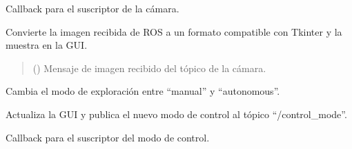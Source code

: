 \documentclass[a4paper,10pt,spanish]{sphinxmanual}
\begin{document}
\begin{fulllineitems}
\begin{description}
\end{description}

\begin{fulllineitems}
\label{\detokenize{squad_state_manager:squad_state_manager.InterfazManager.camera_callback}}
\pysigstartsignatures
{}
\pysigstopsignatures
\sphinxAtStartPar
Callback para el suscriptor de la cámara.

\sphinxAtStartPar
Convierte la imagen recibida de ROS a un formato compatible con Tkinter y la
muestra en la GUI.
\begin{quote}\begin{description}
\sphinxAtStartPar
{} () \textendash{} Mensaje de imagen recibido del tópico de la cámara.

\end{description}\end{quote}

\end{fulllineitems}


\begin{fulllineitems}
\label{\detokenize{squad_state_manager:squad_state_manager.InterfazManager.change_exploration_mode}}
\pysigstartsignatures
{}
\pysigstopsignatures
\sphinxAtStartPar
Cambia el modo de exploración entre “manual” y “autonomous”.

\sphinxAtStartPar
Actualiza la GUI y publica el nuevo modo de control al tópico “/control\_mode”.

\end{fulllineitems}


\begin{fulllineitems}
\label{\detokenize{squad_state_manager:squad_state_manager.InterfazManager.control_mode_callback}}
\pysigstartsignatures
{}
\pysigstopsignatures
\sphinxAtStartPar
Callback para el suscriptor del modo de control.


\end{fulllineitems}
\end{fulllineitems}
\end{document}
